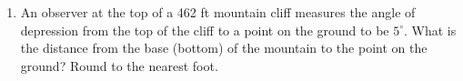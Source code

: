 \begin{enumerate}
\begin{enumerate}
\begin{multicols}{2}
\end{multicols}
\end{enumerate}

\newpage

\item  An observer at the top of a 462 ft mountain cliff measures the angle of depression from the top of the cliff to a point on the ground to be $5^\circ$.  What is the distance from the base (bottom) of the mountain to the point on the ground?  Round to the nearest foot.\vfill






\end{enumerate}



